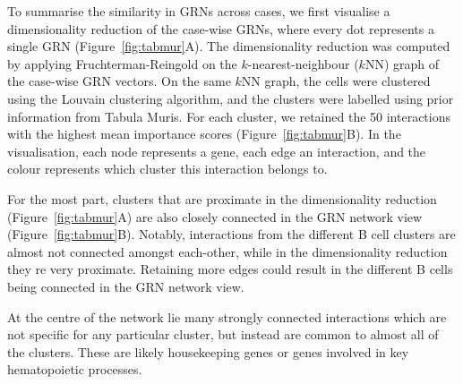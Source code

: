 To summarise the similarity in GRNs across cases, we first visualise a dimensionality reduction of the case-wise GRNs, where every dot represents a single GRN (Figure~\ref{fig:tabmur}A). The dimensionality reduction was computed by applying Fruchterman-Reingold \cite{fruchterman_graphdrawingforcedirected_1991} on the $k$-nearest-neighbour ($k$NN) graph of the case-wise GRN vectors. On the same $k$NN graph, the cells were clustered using the Louvain \cite{blondel_fastunfoldingcommunities_2008} clustering algorithm, and the clusters were labelled using prior information from Tabula Muris.
For each cluster, we retained the 50 interactions with the highest mean importance scores (Figure~\ref{fig:tabmur}B). In the visualisation, each node represents a gene, each edge an interaction, and the colour represents which cluster this interaction belongs to.

For the most part, clusters that are proximate in the dimensionality reduction (Figure~\ref{fig:tabmur}A) are also closely connected in the GRN network view (Figure~\ref{fig:tabmur}B). Notably, interactions from the different B cell clusters are almost not connected amongst each-other, while in the dimensionality reduction they re very proximate. Retaining more edges could result in the different B cells being connected in the GRN network view.

At the centre of the network lie many strongly connected interactions which are not specific for any particular cluster, but instead are common to almost all of the clusters. These are likely housekeeping genes or genes involved in key hematopoietic processes. 


